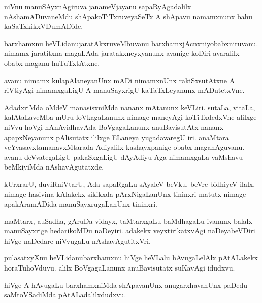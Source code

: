 \begin{mng}
niVnu manuSAyxnAgiruva janameVjayanu sapaRyAgadalilx nAshamADuvaneMdu shApakoTiTxruveyaSeTx A shApavu namamxnunx bahu kaSaTxkikxVDumADide.
\end{mng}

\begin{mng}
barxhamxnu heVLidanu\mdash jaratAkxruveMbuvanu barxhamxjAcnxniyobabxniruvanu. nimamx jaratitxna magaLAda jaratakxneyxyanunx avanige koDiri avaralilx obabx maganu huTuTxtAtxne.
\end{mng}

\begin{mng}
avanu nimamx kulapAlaneyanUnx mADi nimamxnUnx rakiSxsutAtxne A riVtiyAgi nimamxgaLigU A manuSayxrigU kaTaTxLeyanunx mADutetxVne.
\end{mng}

\begin{mng}
AdadxriMda oMdeV manasisxniMda nananx mAtanunx keVLiri. sutaLa, vitaLa, kalAtaLaveMba mUru loVkagaLanunx nimage maneyAgi koTiTxdedxVne alilxge niVvu hoVgi nAnAvidhavAda BoVgagaLanunx anuBavisutAtx nananx apapxNeyanunx pAlisutatx ililxge ELaneya yugadavaregU iri. anaMtara veYvasavxtamanavxMtarada Adiyalilx kashayxpanige obabx maganAguvanu. avanu deVvategaLigU pakaSxgaLigU dAyAdiyu Aga nimamxgaLa vaMshavu beMkiyiMda nAshavAgutatxde.
\end{mng}

\begin{mng}
kUrxrarU, duviRniVtarU, Ada sapaRgaLu sAyaleV beVku. beVre bidhiyeV ilalx, nimage hasivina kAlakekx sikikxda pArxNigaLanUnx tininxri matutx nimage apakAramADida manuSayxrugaLanUnx tininxri.
\end{mng}

\begin{mng}
maMtarx, auSadha, gAruDa vidayx, taMtarxgaLu baMdhagaLu ivanunx balalx manuSayxrige hedarikoMDu naDeyiri. adakekx veyxtirikatxvAgi naDeyabeVDiri hiVge naDedare niVvugaLu nAshavAgutitxVri.
\end{mng}

\begin{mng}
pulasatxyXnu heVLidanu\mdash barxhamxnu hiVge heVLalu hAvugaLelAlx pAtALakekx horaTuhoVduvu. alilx BoVgagaLanunx anuBavisutatx suKavAgi idudxvu.
\end{mng}

\begin{mng}
hiVge A hAvugaLu barxhamxniMda shApavanUnx anugarxhavanUnx paDedu saMtoVSadiMda pAtALadalilxdudxvu.
\end{mng}

